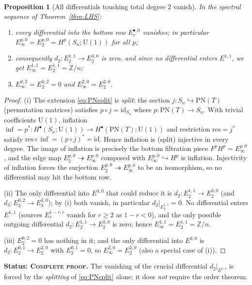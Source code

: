 \documentclass[11pt]{article}
\newtheorem{proposition}[theorem]{Proposition}
\theoremstyle{definition}
\newcommand{\U}{\mathrm{U}}
\newcommand{\PN}{\mathrm{PN}}
\newcommand{\Z}{\mathbb{Z}}
\newcommand{\res}{\mathrm{res}}
\newcommand{\id}{\mathrm{id}}
\newcommand{\STAT}[1]{\noindent\textbf{Status: #1}}
\newcommand{\COMPLETE}{\textsc{Complete proof}}
\begin{document}
\begin{proposition}[All differentials touching total degree $2$ vanish]\label{prop:diffs}
In the spectral sequence of Theorem~\ref{thm:LHS}:
\begin{enumerate}
\item[(i)] every differential \emph{into} the bottom row $E_r^{\bullet,0}$ vanishes; in
particular $E_\infty^{p,0}=E_2^{p,0}=H^p(S_n;\U(1))$ for all $p$;
\item[(ii)] consequently $d_2\colon E_2^{1,1}\to E_2^{3,0}$ is zero, and since no
differential enters $E^{1,1}$, we get $E_\infty^{1,1}=E_2^{1,1}=\Z/n$;
\item[(iii)] $E_\infty^{0,2}=E_2^{0,2}=0$ and $E_\infty^{2,0}=E_2^{2,0}$.
\end{enumerate}
\end{proposition}
\begin{proof}
(i) The extension \eqref{eq:PNsplit} is \emph{split}: the section
$j\colon S_n\hookrightarrow\PN(T)$ (permutation matrices) satisfies $p\circ j=\id_{S_n}$
where $p\colon\PN(T)\to S_n$. With trivial coefficients $\U(1)$, inflation
$\inf=p^{*}\colon H^{\bullet}(S_n;\U(1))\to H^{\bullet}(\PN(T);\U(1))$ and restriction
$\res=j^{*}$ satisfy $\res\circ\inf=(p\circ j)^{*}=\id$. Hence inflation is (split)
injective in every degree. The image of inflation is precisely the bottom filtration piece
$F^{p}H^{p}=E_\infty^{p,0}$, and the edge map $E_2^{p,0}\twoheadrightarrow E_\infty^{p,0}$
composed with $E_\infty^{p,0}\hookrightarrow H^p$ is inflation. Injectivity of inflation
forces the surjection $E_2^{p,0}\twoheadrightarrow E_\infty^{p,0}$ to be an isomorphism, so
no differential may hit the bottom row.

(ii) The only differential into $E^{3,0}$ that could reduce it is
$d_2\colon E_2^{1,1}\to E_2^{3,0}$ (and $d_3\colon E_3^{0,2}\to E_3^{3,0}$); by (i) both
vanish, in particular $d_2|_{E_2^{1,1}}=0$. No differential enters $E^{1,1}$ (sources
$E_r^{1-r,r}$ vanish for $r\ge2$ as $1-r<0$), and the only possible outgoing differential
$d_2\colon E_2^{1,1}\to E_2^{3,0}$ is zero; hence $E_\infty^{1,1}=E_2^{1,1}=\Z/n$.

(iii) $E_2^{0,2}=0$ has nothing in it; and the only differential into $E^{2,0}$ is
$d_2\colon E_2^{0,1}\to E_2^{2,0}$ with $E_2^{0,1}=0$, so $E_\infty^{2,0}=E_2^{2,0}$ (also a
special case of (i)).
\end{proof}
\STAT{\COMPLETE.} The vanishing of the crucial differential $d_2|_{E^{1,1}}$ is forced by
the \emph{splitting} of \eqref{eq:PNsplit} alone; it does \emph{not} require the order
theorem.
\end{document}

